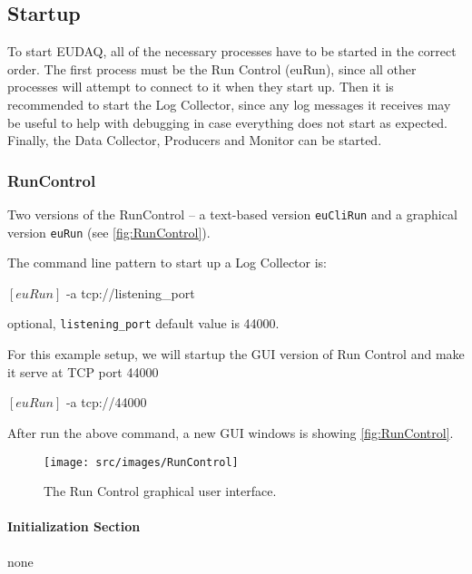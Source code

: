\subsection{Startup}
To start EUDAQ, all of the necessary processes have to be started in the correct order.
The first process must be the Run Control (euRun),
since all other processes will attempt to connect to it when they start up.
Then it is recommended to start the Log Collector,
since any log messages it receives may be useful
to help with debugging in case everything does not start as expected.
Finally, the Data Collector, Producers and Monitor can be started.

\subsubsection{RunControl}
\label{sec:runcontrol}
Two versions of the RunControl -- a text-based version \texttt{euCliRun} and a graphical version \texttt{euRun} (see \autoref{fig:RunControl}).

The command line pattern to start up a Log Collector is:
\begin{listing}[mybash]
$[euRun]$ -a tcp://{listening_port}
\end{listing}

\begin{description}
optional, \texttt{listening\_port} default value is 44000.
\end{description}

For this example setup, we will startup the GUI version of Run Control and make it serve at TCP port 44000\\
\begin{listing}[mybash]
$[euRun]$ -a tcp://44000
\end{listing}

After run the above command, a new GUI windows is showing \autoref{fig:RunControl}.
\begin{figure}[htb]
  \begin{center}
    \texttt{[image: src/images/RunControl]}
    \caption{The Run Control graphical user interface.}
    \label{fig:RunControl}
  \end{center}
\end{figure}

\paragraph{Initialization Section}
none

